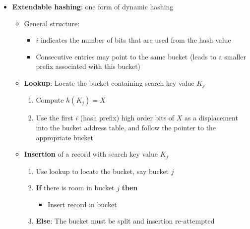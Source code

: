 \begin{itemize}[label=\(\rhd\)]
    \item \textbf{Extendable hashing}: one form of dynamic hashing 
    \begin{itemize}[label=\(\rhd\)]
        \item General structure:
        \begin{itemize}[label=\(\rhd\)]
            \item $i$ indicates the number of bits that are used from the hash value
            \item Consecutive entries may point to the same bucket (leads to a smaller prefix associated with this bucket)
        \end{itemize}
        \item \textbf{Lookup}: Locate the bucket containing search key value $K_j$
        \begin{enumerate}
            \item Compute $h(K_j)=X$
            \item Use the first $i$ (hash prefix) high order bits of $X$ as a displacement into the bucket address table, and follow the pointer to the appropriate bucket
        \end{enumerate}
        \item \textbf{Insertion} of a record with search key value $K_j$
        \begin{enumerate}
            \item Use lookup to locate the bucket, say bucket $j$
            \item \textbf{If} there is room in bucket $j$ \textbf{then}
            \begin{itemize}[label=\(\rhd\)]
                \item[] Insert record in bucket
            \end{itemize}
            \item \textbf{Else}: The bucket must be split and insertion re-attempted
            \begin{itemize}[label=\(\rhd\)]


\end{itemize}
\end{enumerate}
\end{itemize}
\end{itemize}

